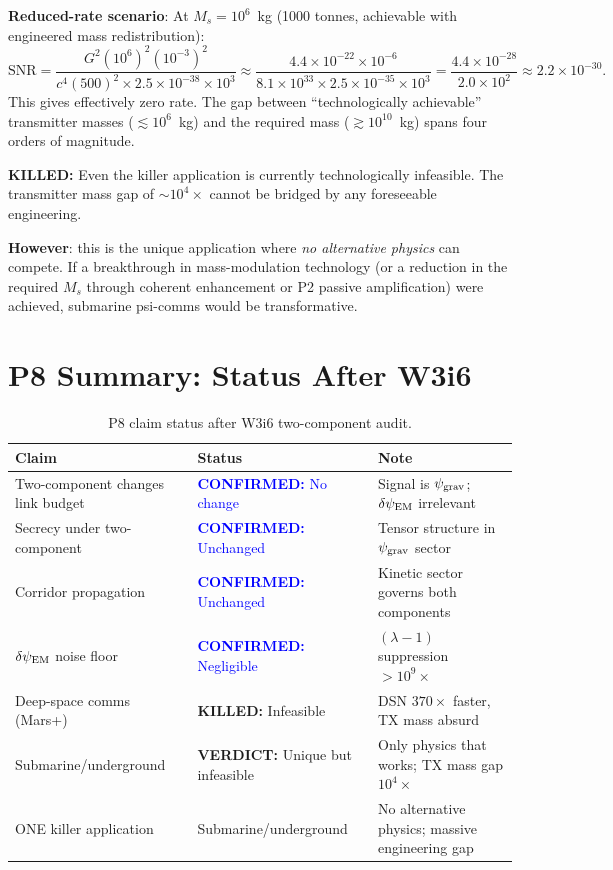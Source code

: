 \documentclass[11pt]{article}
\theoremstyle{definition}
\theoremstyle{remark}
\newcommand{\ee}[1]{\times 10^{#1}}
\newcommand{\psigrav}{\psi_{\rm grav}}
\newcommand{\dpsiEM}{\delta\psi_{\rm EM}}
\newcommand{\lam}{\lambda}
\newcommand{\SNR}{\mathrm{SNR}}
\newcommand{\confirmed}[1]{\textcolor{blue}{\textbf{CONFIRMED:} #1}}
\newcommand{\killed}[1]{\textcolor{red!70!black}{\textbf{KILLED:} #1}}
\newcommand{\verdict}[1]{\textcolor{green!50!black}{\textbf{VERDICT:} #1}}
\begin{document}
\begin{tcolorbox}[colback=green!5!white, colframe=green!50!black,
  title=\textbf{THE ONE KILLER APPLICATION: Submarine/Underground Communication}]
\textbf{Reduced-rate scenario}: At $M_s = 10^6$~kg (1000 tonnes,
achievable with engineered mass redistribution):
\begin{equation}
\SNR = \frac{G^2 (10^6)^2 (10^{-3})^2}{c^4 (500)^2 \times 2.5\ee{-38}
\times 10^3} \approx \frac{4.4\ee{-22} \times 10^{-6}}{8.1\ee{33}
\times 2.5\ee{-35} \times 10^3} = \frac{4.4\ee{-28}}{2.0\ee{2}}
\approx 2.2\ee{-30}.
\end{equation}
This gives effectively zero rate. The gap between ``technologically
achievable'' transmitter masses ($\lesssim 10^6$~kg) and the required
mass ($\gtrsim 10^{10}$~kg) spans four orders of magnitude.

\killed{Even the killer application is currently technologically
infeasible. The transmitter mass gap of $\sim 10^4\times$ cannot be
bridged by any foreseeable engineering.}

\textbf{However}: this is the unique application where \emph{no
alternative physics} can compete. If a breakthrough in mass-modulation
technology (or a reduction in the required $M_s$ through coherent
enhancement or P2 passive amplification) were achieved, submarine
psi-comms would be transformative.
\end{tcolorbox}

\section{P8 Summary: Status After W3i6}
\label{sec:p8_summary}

\begin{table}[h]
\centering
\caption{P8 claim status after W3i6 two-component audit.}
\begin{tabular}{@{}p{4.5cm}p{2.5cm}p{6cm}@{}}
\toprule
Claim & Status & Note \\
\midrule
Two-component changes link budget & \confirmed{No change} &
  Signal is $\psigrav$; $\dpsiEM$ irrelevant \\
Secrecy under two-component & \confirmed{Unchanged} &
  Tensor structure in $\psigrav$ sector \\
Corridor propagation & \confirmed{Unchanged} &
  Kinetic sector governs both components \\
$\dpsiEM$ noise floor & \confirmed{Negligible} &
  $(\lam-1)$ suppression $>10^9\times$ \\
Deep-space comms (Mars+) & \killed{Infeasible} &
  DSN $370\times$ faster, TX mass absurd \\
Submarine/underground & \verdict{Unique but infeasible} &
  Only physics that works; TX mass gap $10^4\times$ \\
ONE killer application & Submarine/underground & No alternative physics; massive
  engineering gap \\
\bottomrule
\end{tabular}
\label{tab:p8_summary_w3i6}
\end{table}
\end{document}

